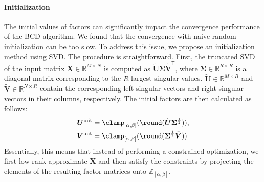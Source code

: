 

\paragraph*{Initialization}
The initial values of factors can significantly impact the convergence performance of the BCD algorithm. We found that the convergence with naive random initialization can be too slow. To address this issue, we propose an initialization method using SVD. The procedure is straightforward. First, the truncated SVD of the input matrix $\bm{X} \in \mathbb{R}^{M \times N}$ is computed as $\tilde{\bm{U}} \bm{\Sigma} \tilde{\bm{V}}^\mathsf{T}$, where $\bm{\Sigma} \in \mathbb{R}^{R \times R}$ is a diagonal matrix corresponding to the $R$ largest singular values. $\tilde{\bm{U}} \in \mathbb{R}^{M \times R}$ and $\tilde{\bm{V}} \in \mathbb{R}^{N \times R}$ contain the corresponding left-singular vectors and right-singular vectors in their columns, respectively. The initial factors are then calculated as follows:
\begin{align}
    \bm{U}^{\rm init} = \clamp_{[\alpha,\beta]}(\round(\tilde{\bm{U}} \bm{\Sigma}^\frac{1}{2})), \label{eq:initialization_u} \\
    \bm{V}^{\rm init} = \clamp_{[\alpha,\beta]}(\round(\bm{\Sigma}^\frac{1}{2} \tilde{\bm{V}})). \label{eq:initialization_v}
\end{align}
Essentially, this means that instead of performing a constrained optimization, we first low-rank approximate $\bm{X}$ and then satisfy the constraints by projecting the elements of the resulting factor matrices onto $\mathbb{Z}_{[\alpha,\beta]}$.

